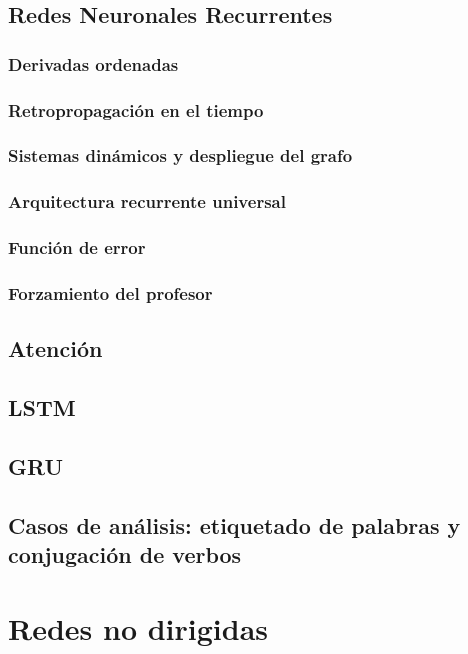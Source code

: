 \documentclass[12pt,openany]{book}
\begin{document}
\chapter{Redes Neuronales Recurrentes}
\section{Derivadas ordenadas}
\section{Retropropagación en el tiempo}
\section{Sistemas dinámicos y despliegue del grafo}
\section{Arquitectura recurrente universal}
\section{Función de error}
\section{Forzamiento del profesor}

\chapter{Atención}
\chapter{LSTM}
\chapter{GRU}
\chapter{Casos de análisis: etiquetado de palabras y conjugación de verbos}

\part{Redes no dirigidas}
\end{document}
